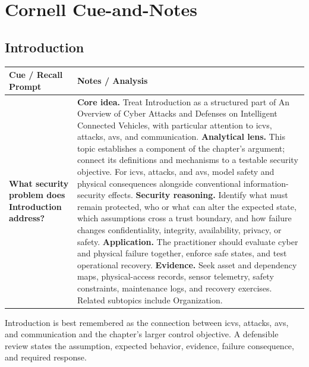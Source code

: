 \documentclass[11pt]{article}
\newcommand{\CornellHeader}{%
\rowcolor{Navy}\color{white}\bfseries Cue / Recall Prompt & \color{white}\bfseries Notes / Analysis\\\hline}
\newcommand{\CornellRow}[2]{%
\cellcolor{CueGray}\RaggedRight\textbf{#1} & \RaggedRight #2\\\hline}
\begin{document}
\section*{Cornell Cue-and-Notes}
\subsection*{Introduction}
\begin{longtable}{>{\RaggedRight\arraybackslash}p{}|>{\RaggedRight\arraybackslash}p{}}
\CornellHeader
\CornellRow{What security problem does Introduction address?}{\textbf{Core idea.} Treat Introduction as a structured part of An Overview of Cyber Attacks and Defenses on Intelligent Connected Vehicles, with particular attention to icvs, attacks, avs, and communication. \textbf{Analytical lens.} This topic establishes a component of the chapter's argument; connect its definitions and mechanisms to a testable security objective. For icvs, attacks, and avs, model safety and physical consequences alongside conventional information-security effects. \textbf{Security reasoning.} Identify what must remain protected, who or what can alter the expected state, which assumptions cross a trust boundary, and how failure changes confidentiality, integrity, availability, privacy, or safety. \textbf{Application.} The practitioner should evaluate cyber and physical failure together, enforce safe states, and test operational recovery. \textbf{Evidence.} Seek asset and dependency maps, physical-access records, sensor telemetry, safety constraints, maintenance logs, and recovery exercises. Related subtopics include Organization.}
\end{longtable}
\begin{topicsummary}
Introduction is best remembered as the connection between icvs, attacks, avs, and communication and the chapter's larger control objective. A defensible review states the assumption, expected behavior, evidence, failure consequence, and required response.
\end{topicsummary}
\end{document}
